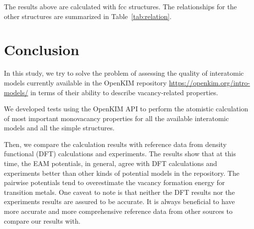 \documentclass[%
 reprint,
 amsmath,amssymb,
 aps,
]{revtex4-1}
\begin{document}
The results above are calculated with fcc structures.
The relationships for the other structures are summarized in Table~\ref{tab:relation}.
%
%
%


\section{\label{sec:conclusion}Conclusion}

In this study, we try to solve the problem of assessing the quality of interatomic models currently available in the OpenKIM repository \url{https://openkim.org/intro-models/} in terms of their ability to describe vacancy-related properties.

We developed tests using the OpenKIM API to perform the atomistic calculation of most important monovacancy properties for all the available interatomic models and all the simple structures.

Then, we compare the calculation results with reference data from density functional (DFT) calculations and experiments.
The results show that at this time, the EAM potentials, in general, agree with DFT calculations and experiments better than other kinds of potential models in the repository.
The pairwise potentials tend to overestimate the vacancy formation energy for transition metals.
One caveat to note is that neither the DFT results nor the experiments results are assured to be accurate.
It is always beneficial to have more accurate and more comprehensive reference data from other sources to compare our results with.
\end{document}

